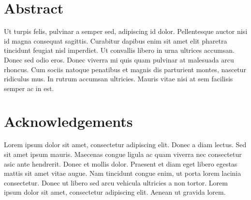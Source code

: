 \documentclass[12pt]{article}
\begin{document}
\blankpage	%

\section*{Abstract}
Ut turpis felis, pulvinar a semper sed, adipiscing id dolor. Pellentesque auctor nisi id magna consequat sagittis. Curabitur dapibus enim sit amet elit pharetra tincidunt feugiat nisl imperdiet. Ut convallis libero in urna ultrices accumsan. Donec sed odio eros. Donec viverra mi quis quam pulvinar at malesuada arcu rhoncus. Cum sociis natoque penatibus et magnis dis parturient montes, nascetur ridiculus mus. In rutrum accumsan ultricies. Mauris vitae nisi at sem facilisis semper ac in est.

\blankpage

\section*{Acknowledgements}
Lorem ipsum dolor sit amet, consectetur adipiscing elit. Donec a diam lectus. Sed sit amet ipsum mauris. Maecenas congue ligula ac quam viverra nec consectetur \gls{asic} ante hendrerit. Donec et mollis dolor. Praesent et diam eget libero egestas \cite{obt} mattis sit amet vitae augue. Nam tincidunt congue enim, ut porta lorem lacinia consectetur. Donec ut libero sed arcu vehicula ultricies a non tortor. Lorem ipsum dolor sit amet, consectetur adipiscing elit. Aenean ut gravida lorem.

\blankpage

\setcounter{tocdepth}{3}
\tableofcontents

\blankpage

\setlength{\parskip}{0.2in}



%

%


\newpage

\clearpage



\newpage

\printglossaries

%
%
%
%
%
\end{document}
